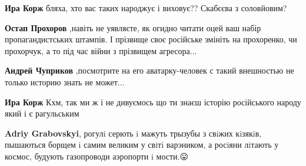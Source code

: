\begin{itemize}
\begin{itemize}
 
\textbf{Ира Корж} бляха, хто вас таких народжує і виховує?? Скабєєва з соловйовим?

 
\textbf{Остап Прохоров} ,навіть не уявляєте, як огидно читати оцей ваш набір
пропагандистських штампів. І прізвище своє російське змініть на прохоренко, чи
прохорчук, а то під час війни з прізвищем агресора...

 
\textbf{Андрей Чуприков} ,посмотрите на его аватарку-человек с такий внешностью не только историю знать не может...

 
\textbf{Ира Корж} Кхм, так ми ж і не дивуємось що ти знаєш історію російського народу який і є рагульським

 
\textbf{Adriy Grabovskyi}, рогулi серють i мажуть трызубы з свiжих кiзякiв, пышаються борщем i самим великим у свiтi варэником, а росiяни лiтають у космос, будують газопроводи аэропорти i мости.😛

 

\end{itemize}
\end{itemize}
